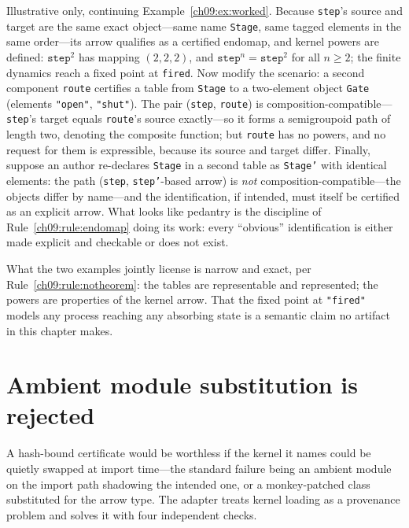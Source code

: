 \begin{example}\label{ch09:ex:powers}
Illustrative only, continuing Example~\ref{ch09:ex:worked}. Because \texttt{step}'s source and target are the same exact object---same name \texttt{Stage}, same tagged elements in the same order---its arrow qualifies as a certified endomap, and kernel powers are defined: $\texttt{step}^2$ has mapping $(2,2,2)$, and $\texttt{step}^n = \texttt{step}^2$ for all $n \geq 2$; the finite dynamics reach a fixed point at \texttt{fired}. Now modify the scenario: a second component \texttt{route} certifies a table from \texttt{Stage} to a two-element object \texttt{Gate} (elements \texttt{"open"}, \texttt{"shut"}). The pair (\texttt{step}, \texttt{route}) is composition-compatible---\texttt{step}'s target equals \texttt{route}'s source exactly---so it forms a semigroupoid path of length two, denoting the composite function; but \texttt{route} has no powers, and no request for them is expressible, because its source and target differ. Finally, suppose an author re-declares \texttt{Stage} in a second table as \texttt{Stage'} with identical elements: the path (\texttt{step}, \texttt{step'}-based arrow) is \emph{not} composition-compatible---the objects differ by name---and the identification, if intended, must itself be certified as an explicit arrow. What looks like pedantry is the discipline of Rule~\ref{ch09:rule:endomap} doing its work: every ``obvious'' identification is either made explicit and checkable or does not exist.
\end{example}

What the two examples jointly license is narrow and exact, per Rule~\ref{ch09:rule:notheorem}: the tables are representable and represented; the powers are properties of the kernel arrow. That the fixed point at \texttt{"fired"} models any process reaching any absorbing state is a semantic claim no artifact in this chapter makes.

\section{Ambient module substitution is rejected}\label{ch09:sec:ambient}

A hash-bound certificate would be worthless if the kernel it names could be quietly swapped at import time---the standard failure being an ambient module on the import path shadowing the intended one, or a monkey-patched class substituted for the arrow type. The adapter treats kernel loading as a provenance problem and solves it with four independent checks.

